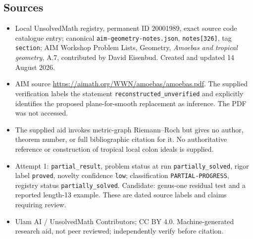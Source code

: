 \documentclass[11pt]{article}
\begin{document}
\subsection{Sources}
\begin{itemize}
\item Local UnsolvedMath registry, permanent ID 20001989, exact source code catalogue entry; canonical \texttt{aim-geometry-notes.json}, \texttt{notes[326]}, tag \texttt{section}; AIM Workshop Problem Lists, Geometry, \emph{Amoebas and tropical geometry}, A.7, contributed by David Eisenbud. Created and updated 14 August 2026.
\item AIM source \url{https://aimath.org/WWN/amoebas/amoebas.pdf}. The supplied verification labels the statement \texttt{reconstructed\_unverified} and explicitly identifies the proposed plane-for-smooth replacement as inference. The PDF was not accessed.
\item The supplied aid invokes metric-graph Riemann--Roch but gives no author, theorem number, or full bibliographic citation for it. No authoritative reference or construction of tropical local colon ideals is supplied.
\item Attempt 1: \texttt{partial\_result}, problem status at run \texttt{partially\_solved}, rigor label \texttt{proved}, novelty confidence \texttt{low}; classification \texttt{PARTIAL-PROGRESS}, registry status \texttt{partially\_solved}. Candidate: genus-one residual test and a reported length-13 example. These are dated source labels and claims requiring review.
\item Ulam AI / UnsolvedMath Contributors; CC BY 4.0. Machine-generated research aid, not peer reviewed; independently verify before citation.
\end{itemize}
\end{document}
